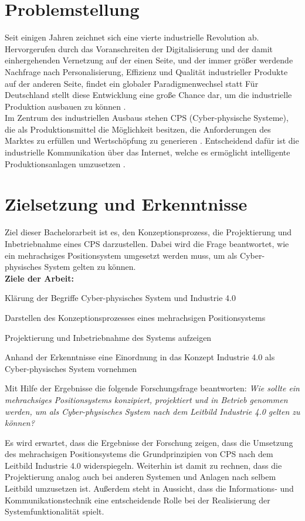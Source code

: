 \documentclass[12pt, a4paper, twoside]{article} %
\begin{document}
\section{Problemstellung}
Seit einigen Jahren zeichnet sich eine vierte industrielle Revolution ab. Hervorgerufen durch das Voranschreiten der Digitalisierung und der damit einhergehenden Vernetzung auf der einen Seite, und der immer größer werdende Nachfrage nach Personalisierung, Effizienz und Qualität industrieller Produkte auf der anderen Seite, findet ein globaler Paradigmenwechsel statt \cite[S. 33]{Bauernhansl2014} Für Deutschland stellt diese Entwicklung eine große Chance dar, um die industrielle Produktion ausbauen zu können \cite[S. 1]{Pistorius2020}.\\
Im Zentrum des industriellen Ausbaus stehen CPS (Cyber-physische Systeme), die als Produktionsmittel die Möglichkeit besitzen, die Anforderungen des Marktes zu erfüllen und Wertschöpfung zu generieren \cite[S. 10]{Pistorius2020}. Entscheidend dafür ist die industrielle Kommunikation über das Internet, welche es ermöglicht \glqq intelligente\grqq{} Produktionsanlagen umzusetzen \cite[S. 30]{Bauernhansl2014}.

\section{Zielsetzung und Erkenntnisse}
Ziel dieser Bachelorarbeit ist es, den Konzeptionsprozess, die Projektierung und Inbetriebnahme eines CPS darzustellen. Dabei wird die Frage beantwortet, wie ein mehrachsiges Positionsystem umgesetzt werden muss, um als Cyber-physisches System gelten zu können. \\
\textbf{Ziele der Arbeit:}
\begin{compactitem}
	\item Klärung der Begriffe Cyber-physisches System und Industrie 4.0
	\item Darstellen des Konzeptionsprozesses eines mehrachsigen Positionsystems
	\item Projektierung und Inbetriebnahme des Systems aufzeigen
	\item Anhand der Erkenntnisse eine Einordnung in das Konzept Industrie 4.0 als Cyber-physisches System vornehmen
	\item Mit Hilfe der Ergebnisse die folgende Forschungsfrage beantworten: \textit{Wie sollte ein mehrachsiges Positionsystems konzipiert, projektiert und in Betrieb genommen werden, um als Cyber-physisches System nach dem Leitbild Industrie 4.0 gelten zu können?}
\end{compactitem}
Es wird erwartet, dass die Ergebnisse der Forschung zeigen, dass die Umsetzung des mehrachsigen Positionsystems die Grundprinzipien von CPS nach dem Leitbild Industrie 4.0 widerspiegeln. Weiterhin ist damit zu rechnen, dass die Projektierung analog auch bei anderen Systemen und Anlagen nach selbem Leitbild umzusetzen ist. Außerdem steht in Aussicht, dass die Informations- und Kommunikationstechnik eine entscheidende Rolle bei der Realisierung der Systemfunktionalität spielt. 
\end{document}
